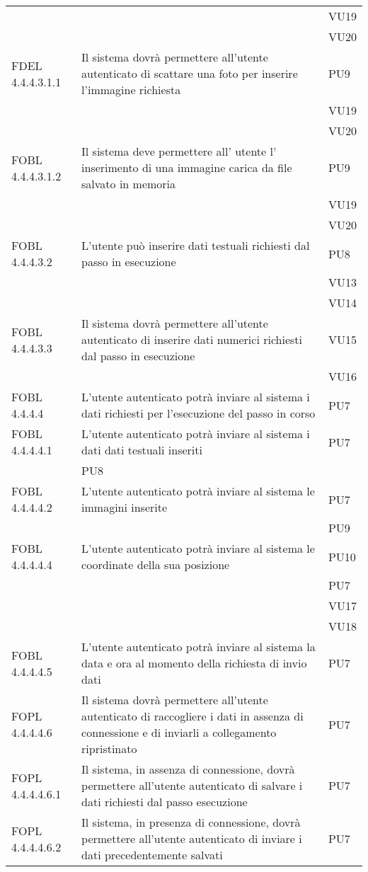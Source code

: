 \begin{longtable}{lXp{}}
&&VU19\\ 
&&VU20\\ 
\midrule 
FDEL 4.4.4.3.1.1&Il sistema dovrà permettere all'utente autenticato di scattare una foto per inserire l'immagine richiesta&PU9\\ 
&&VU19\\ 
&&VU20\\ 
\midrule 
FOBL 4.4.4.3.1.2&Il sistema deve permettere all' utente l' inserimento di una immagine carica da file salvato in memoria&PU9\\ 
&&VU19\\ 
&&VU20\\ 
\midrule
FOBL 4.4.4.3.2&L'utente può inserire dati testuali richiesti dal passo in esecuzione&PU8\\ 
&&VU13\\ 
&&VU14\\ 
\midrule 
FOBL 4.4.4.3.3&Il sistema dovrà permettere all'utente autenticato di inserire dati numerici richiesti dal passo in esecuzione&VU15\\ 
&&VU16\\ 
\midrule 
FOBL 4.4.4.4&L'utente autenticato potrà inviare al sistema i dati richiesti per l'esecuzione del passo in corso&PU7\\ 
\midrule 
FOBL 4.4.4.4.1&L'utente autenticato potrà inviare al sistema i dati dati testuali inseriti&PU7\\ 
&PU8\\ 
\midrule 
FOBL 4.4.4.4.2&L'utente autenticato potrà inviare al sistema le immagini inserite&PU7\\ 
&&PU9\\ 
\midrule
FOBL 4.4.4.4.4&L'utente autenticato potrà inviare al sistema le coordinate della sua posizione&PU10\\ 
&&PU7\\ 
&&VU17\\ 
&&VU18\\ 
\midrule 
FOBL 4.4.4.4.5&L'utente autenticato potrà inviare al sistema la data e ora al momento della richiesta di invio dati&PU7\\ 
\midrule
FOPL 4.4.4.4.6&Il sistema dovrà permettere all'utente autenticato di raccogliere i dati in assenza di connessione e di inviarli a collegamento ripristinato&PU7\\ 
\midrule 
FOPL 4.4.4.4.6.1&Il sistema, in assenza di connessione, dovrà permettere all'utente autenticato di salvare i dati richiesti dal passo esecuzione&PU7\\ 
\midrule 
FOPL 4.4.4.4.6.2& Il sistema, in presenza di connessione, dovrà permettere all'utente autenticato di inviare i dati precedentemente salvati&PU7\\ 

\end{longtable}
